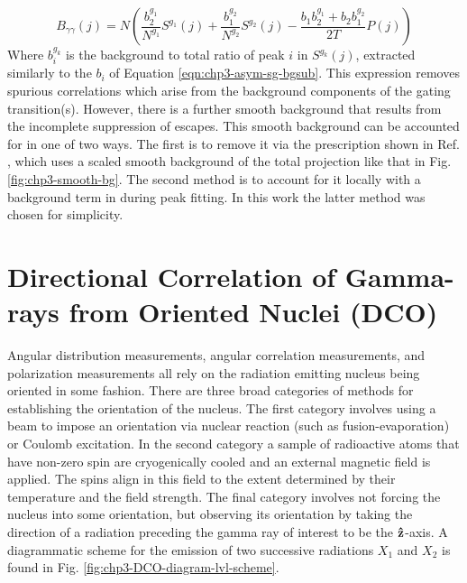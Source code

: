 \begin{equation}
\label{eqn:chp3-asym-bg-dg-exp}
B_{\gamma{}\gamma{}}(j)=N\left(\frac{b^{g_1}_2}{N^{g_1}}S^{g_1}(j) + \frac{b^{g_2}_1}{N^{g_2}}S^{g_2}(j) - \frac{b_1b^{g_1}_2+b_2b^{g_2}_1}{2T}P(j) \right)
\end{equation}
Where $b^{g_k}_i$ is the background to total ratio of peak $i$ in $S^{g_k}(j)$, extracted similarly to the $b_i$ of Equation \ref{eqn:chp3-asym-sg-bgsub}. This expression removes spurious correlations which arise from the background components of the gating transition(s). However, there is a further smooth background that results from the incomplete suppression of escapes. This smooth background can be accounted for in one of two ways. The first is to remove it via the prescription shown in Ref. \cite{asymBGSub}, which uses a scaled smooth background of the total projection like that in Fig. \ref{fig:chp3-smooth-bg}. The second method is to account for it locally with a background term in during peak fitting. In this work the latter method was chosen for simplicity.

\section{Directional Correlation of Gamma-rays from Oriented Nuclei (DCO)}
\label{sec:exp-pr-data-ang}
Angular distribution measurements, angular correlation measurements, and polarization measurements all rely on the radiation emitting nucleus being oriented in some fashion. There are three broad categories of methods for establishing the orientation of the nucleus. The first category involves using a beam to impose an orientation via nuclear reaction (such as fusion-evaporation) or Coulomb excitation. In the second category a sample of radioactive atoms that have non-zero spin are cryogenically cooled and an external magnetic field is applied. The spins align in this field to the extent determined by their temperature and the field strength. The final category involves not forcing the nucleus into some orientation, but observing its orientation by taking the direction of a radiation preceding the gamma ray of interest to be the $\boldsymbol{\hat{\textbf{z}}}$-axis. A diagrammatic scheme for the emission of two successive radiations $X_1$ and $X_2$ is found in Fig. \ref{fig:chp3-DCO-diagram-lvl-scheme}.

